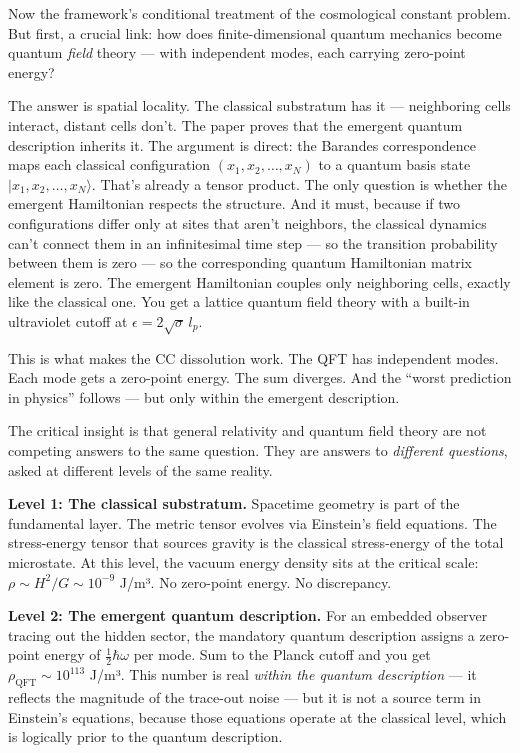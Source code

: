 \documentclass[
]{article}
\begin{document}
Now the framework's conditional treatment of the cosmological constant
problem. But first, a crucial link: how does finite-dimensional quantum
mechanics become quantum \emph{field} theory --- with independent modes,
each carrying zero-point energy?

The answer is spatial locality. The classical substratum has it ---
neighboring cells interact, distant cells don't. The paper proves that
the emergent quantum description inherits it. The argument is direct:
the Barandes correspondence maps each classical configuration
\((x_1, x_2, \ldots, x_N)\) to a quantum basis state
\(|x_1, x_2, \ldots, x_N\rangle\). That's already a tensor product. The
only question is whether the emergent Hamiltonian respects the
structure. And it must, because if two configurations differ only at
sites that aren't neighbors, the classical dynamics can't connect them
in an infinitesimal time step --- so the transition probability between
them is zero --- so the corresponding quantum Hamiltonian matrix element
is zero. The emergent Hamiltonian couples only neighboring cells,
exactly like the classical one. You get a lattice quantum field theory
with a built-in ultraviolet cutoff at
\(\epsilon = 2\sqrt{\sigma}\,l_p\).

This is what makes the CC dissolution work. The QFT has independent
modes. Each mode gets a zero-point energy. The sum diverges. And the
``worst prediction in physics'' follows --- but only within the emergent
description.

The critical insight is that general relativity and quantum field theory
are not competing answers to the same question. They are answers to
\emph{different questions}, asked at different levels of the same
reality.

\textbf{Level 1: The classical substratum.} Spacetime geometry is part
of the fundamental layer. The metric tensor evolves via Einstein's field
equations. The stress-energy tensor that sources gravity is the
classical stress-energy of the total microstate. At this level, the
vacuum energy density sits at the critical scale:
\(\rho \sim H^2/G \sim 10^{-9}\) J/m³. No zero-point energy. No
discrepancy.

\textbf{Level 2: The emergent quantum description.} For an embedded
observer tracing out the hidden sector, the mandatory quantum
description assigns a zero-point energy of \(\frac{1}{2}\hbar\omega\)
per mode. Sum to the Planck cutoff and you get
\(\rho_{\text{QFT}} \sim 10^{113}\) J/m³. This number is real
\emph{within the quantum description} --- it reflects the magnitude of
the trace-out noise --- but it is not a source term in Einstein's
equations, because those equations operate at the classical level, which
is logically prior to the quantum description.
\end{document}

